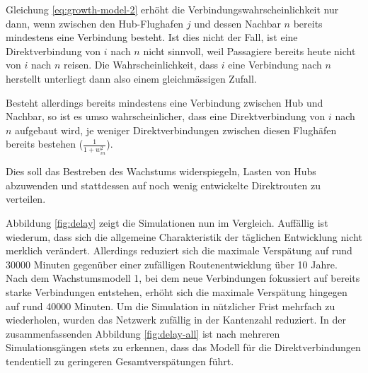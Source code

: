 Gleichung \ref{eq:growth-model-2} erhöht die Verbindungswahrscheinlichkeit nur dann, wenn zwischen den Hub-Flughafen $j$ und dessen Nachbar $n$ bereits mindestens eine Verbindung besteht.
Ist dies nicht der Fall, ist eine Direktverbindung von $i$ nach $n$ nicht sinnvoll, weil Passagiere bereits heute nicht von $i$ nach $n$ reisen.
Die Wahrscheinlichkeit, dass $i$ eine Verbindung nach $n$ herstellt unterliegt dann also einem gleichmässigen Zufall.

Besteht allerdings bereits mindestens eine Verbindung zwischen Hub und Nachbar, so ist es umso wahrscheinlicher, dass eine Direktverbindung von $i$ nach $n$ aufgebaut wird,
je weniger Direktverbindungen zwischen diesen Flughäfen bereits bestehen ($ \frac{1}{1 + w_{in}^{2}}$).

Dies soll das Bestreben des Wachstums widerspiegeln, Lasten von Hubs abzuwenden und stattdessen auf noch wenig entwickelte Direktrouten zu verteilen.

Abbildung \ref{fig:delay} zeigt die Simulationen nun im Vergleich.
Auffällig ist wiederum, dass sich die allgemeine Charakteristik der täglichen Entwicklung nicht merklich verändert.
Allerdings reduziert sich die maximale Verspätung auf rund 30000 Minuten gegenüber einer zufälligen Routenentwicklung über 10 Jahre.
Nach dem Wachstumsmodell 1, bei dem neue Verbindungen fokussiert auf bereits starke Verbindungen entstehen, erhöht sich die maximale Verspätung hingegen auf rund 40000 Minuten.
Um die Simulation in nützlicher Frist mehrfach zu wiederholen, wurden das Netzwerk zufällig in der Kantenzahl reduziert.
In der zusammenfassenden Abbildung \ref{fig:delay-all} ist nach mehreren Simulationsgängen stets zu erkennen, dass das Modell für die Direktverbindungen tendentiell zu geringeren Gesamtverspätungen führt.

